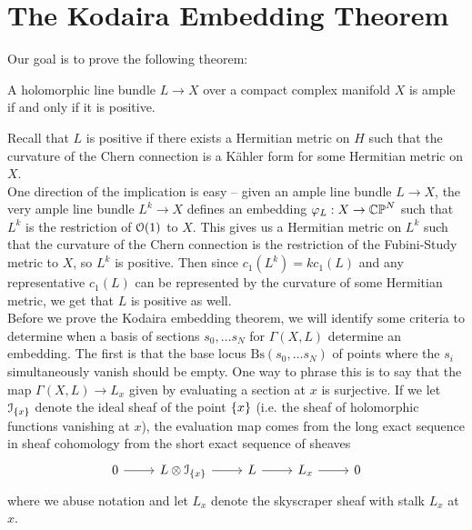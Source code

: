 %
\section{The Kodaira Embedding Theorem}
%
Our goal is to prove the following theorem:
%
\begin{thm}
A holomorphic line bundle $L \to X$ over a compact complex manifold $X$ is ample if and
only if it is positive.
\end{thm}
%
Recall that $L$ is positive if there exists a Hermitian metric on $H$ such
that the curvature of the Chern connection is a K\"ahler form for
some Hermitian metric on $X$. \\

One direction of the implication is easy -- given an ample line bundle $L \to X$,
the very ample line bundle $L^k \to X$ defines an embedding $\varphi_L : X \to \mathbb{CP}^N$
such that $L^k$ is the restriction of $\mathcal{O}(1)$ to $X$. This gives us a Hermitian
metric on $L^k$ such that the curvature of the Chern connection is the
restriction of the Fubini-Study metric to $X$, so $L^k$ is positive. Then since
$c_1(L^k) = kc_1(L)$ and any representative $c_1(L)$ can be represented by the
curvature of some Hermitian metric, we get that $L$ is positive as well. \\

Before we prove the Kodaira embedding theorem, we will identify some criteria
to determine when a basis of sections $s_0,\ldots s_N$ for $\Gamma(X,L)$ determine
an embedding. The first is that the base locus $\mathrm{Bs}(s_0,\ldots s_N)$ of points
where the $s_i$ simultaneously vanish should be empty. One way to phrase
this is to say that the map $\Gamma(X,L) \to L_x$ given by evaluating a section
at $x$ is surjective. If we let $\mathcal{I}_{\left\lbrace x \right\rbrace}$ denote the ideal sheaf
of the point $\left\lbrace x \right\rbrace$ (i.e. the sheaf of holomorphic functions vanishing at $x$),
the evaluation map comes from the long exact sequence in sheaf cohomology from the
short exact sequence of sheaves
\[\begin{tikzcd}
0 \ar[r] & L \otimes \mathcal{I}_{\set{x}} \ar[r] & L \ar[r] & L_x \ar[r] & 0
\end{tikzcd}\]
where we abuse notation and let $L_x$ denote the skyscraper sheaf with
stalk $L_x$ at $x$. \\

